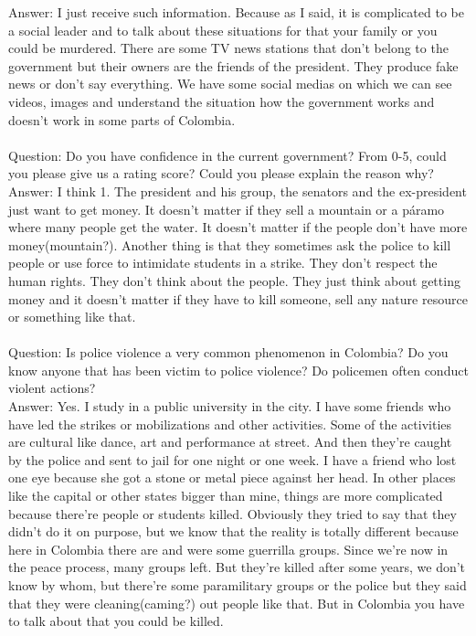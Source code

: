 \documentclass{phyasgn}\usepackage{nag}
\begin{document}
Answer: I just receive such information. Because as I said, it is complicated to be a social leader and to talk about these situations for that your family or you could be murdered. There are some TV news stations that don’t belong to the government but their owners are the friends of the president. They produce fake news or don’t say everything. We have some social medias on which we can see videos, images and understand the situation how the government works and doesn’t work in some parts of Colombia.\\
\\
Question: Do you have confidence in the current government? From 0-5, could you please give us a rating score? Could you please explain the reason why?\\
Answer: I think 1. The president and his group, the senators and the ex-president just want to get money. It doesn’t matter if they sell a mountain or a páramo where many people get the water. It doesn’t matter if the people don’t have more money(mountain?). Another thing is that they sometimes ask the police to kill people or use force to intimidate students in a strike. They don’t respect the human rights. They don’t think about the people. They just think about getting money and it doesn’t matter if they have to kill someone, sell any nature resource or something like that. \\
\\
Question: Is police violence a very common phenomenon in Colombia? Do you know anyone that has been victim to police violence? Do policemen often conduct violent actions?\\
Answer: Yes. I study in a public university in the city. I have some friends who have led the strikes or mobilizations and other activities. Some of the activities are cultural like dance, art and performance at street. And then they’re caught by the police and sent to jail for one night or one week. I have a friend who lost one eye because she got a stone or metal piece against her head. In other places like the capital or other states bigger than mine, things are more complicated because there’re people or students killed. Obviously they tried to say that they didn’t do it on purpose, but we know that the reality is totally different because here in Colombia there are and were some guerrilla groups. Since we’re now in the peace process, many groups left. But they’re killed after some years, we don’t know by whom, but there’re some paramilitary groups or the police but they said that they were cleaning(caming?) out people like that. But in Colombia you have to talk about that you could be killed.\\
\end{document}
